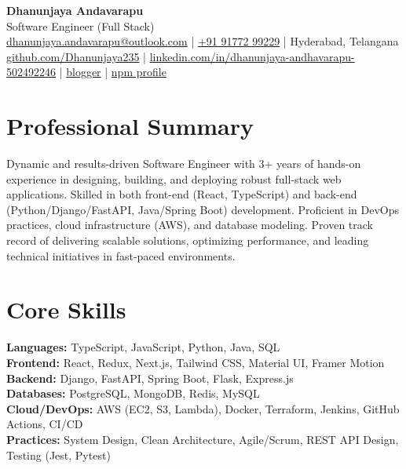 \documentclass[11pt]{article}
\begin{document}
\begin{center}
    {\LARGE \textbf{Dhanunjaya Andavarapu}}\\
    \vspace{4pt}
    Software Engineer (Full Stack)\\
    \vspace{4pt}
    \href{mailto:dhanunjaya.andavarapu@outlook.com}{dhanunjaya.andavarapu@outlook.com} \quad | \quad
    \href{tel:+919177299229}{+91 91772 99229} \quad | \quad
    Hyderabad, Telangana\\
    \vspace{4pt}
    \href{https://github.com/Dhanunjaya235}{github.com/Dhanunjaya235} \quad | \quad
    \href{https://www.linkedin.com/in/dhanunjaya-andhavarapu-502492246}{linkedin.com/in/dhanunjaya-andhavarapu-502492246} \quad | \quad
    \href{https://www.blogger.com/blog/pages/2357939272283650645}{blogger} \quad | \quad
    \href{https://www.npmjs.com/settings/dhanunjay/packages}{npm profile}
\end{center}

\section*{Professional Summary}
Dynamic and results-driven Software Engineer with 3+ years of hands-on experience in designing, building, and deploying robust full-stack web applications. Skilled in both front-end (React, TypeScript) and back-end (Python/Django/FastAPI, Java/Spring Boot) development. Proficient in DevOps practices, cloud infrastructure (AWS), and database modeling. Proven track record of delivering scalable solutions, optimizing performance, and leading technical initiatives in fast-paced environments.

\section*{Core Skills}
\textbf{Languages:} TypeScript, JavaScript, Python, Java, SQL \\
\textbf{Frontend:} React, Redux, Next.js, Tailwind CSS, Material UI, Framer Motion \\
\textbf{Backend:} Django, FastAPI, Spring Boot, Flask, Express.js \\
\textbf{Databases:} PostgreSQL, MongoDB, Redis, MySQL \\
\textbf{Cloud/DevOps:} AWS (EC2, S3, Lambda), Docker, Terraform, Jenkins, GitHub Actions, CI/CD \\
\textbf{Practices:} System Design, Clean Architecture, Agile/Scrum, REST API Design, Testing (Jest, Pytest)
\end{document}
